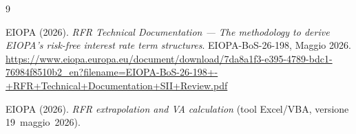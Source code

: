 \documentclass[11pt,a4paper]{article}
\theoremstyle{definition}
\theoremstyle{remark}
\begin{document}
\begin{thebibliography}{9}

EIOPA (2026).
\textit{RFR Technical Documentation --- The methodology to derive EIOPA's risk-free
interest rate term structures}. EIOPA-BoS-26-198, Maggio 2026.
\url{https://www.eiopa.europa.eu/document/download/7da8a1f3-e395-4789-bdc1-76984f8510b2_en?filename=EIOPA-BoS-26-198+-+RFR+Technical+Documentation+SII+Review.pdf}

EIOPA (2026).
\textit{RFR extrapolation and VA calculation} (tool Excel/VBA, versione 19~maggio~2026).

\end{thebibliography}
\end{document}
